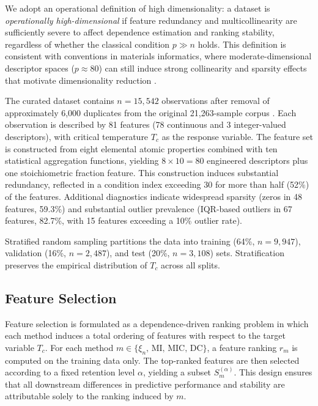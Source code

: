 \documentclass[twoside,11pt]{article}
\begin{document}
We adopt an operational definition of high dimensionality: a dataset is
\emph{operationally high-dimensional} if feature redundancy and multicollinearity
are sufficiently severe to affect dependence estimation and ranking stability,
regardless of whether the classical condition $p \gg n$ holds. This definition
is consistent with conventions in materials informatics, where
moderate-dimensional descriptor spaces ($p \approx 80$) can still induce strong
collinearity and sparsity effects that motivate dimensionality reduction
\citep{Fan2014challenges, Johnstone2009statistical, Stanev2018machine,
Yu2023prediction}.

The curated dataset contains $n = 15{,}542$ observations after removal of
approximately 6,000 duplicates from the original 21,263-sample corpus
\citep{Hamidieh2018data}. Each observation is described by 81 features
(78 continuous and 3 integer-valued descriptors), with critical temperature
$T_c$ as the response variable. The feature set is constructed from eight
elemental atomic properties combined with ten statistical aggregation functions,
yielding $8 \times 10 = 80$ engineered descriptors plus one stoichiometric
fraction feature. This construction induces substantial redundancy, reflected in
a condition index exceeding 30 for more than half (52\%) of the features.
Additional diagnostics indicate widespread sparsity (zeros in 48 features,
59.3\%) and substantial outlier prevalence (IQR-based outliers in 67 features,
82.7\%, with 15 features exceeding a 10\% outlier rate).

Stratified random sampling partitions the data into training (64\%,
$n = 9{,}947$), validation (16\%, $n = 2{,}487$), and test (20\%,
$n = 3{,}108$) sets. Stratification preserves the empirical distribution of
$T_c$ across all splits.

\subsection{Feature Selection}
Feature selection is formulated as a dependence-driven ranking problem in which
each method induces a total ordering of features with respect to the target
variable $T_c$. For each method
$m \in \{\xi_n,\, \mathrm{MI},\, \mathrm{MIC},\, \mathrm{DC}\}$, a feature
ranking $r_m$ is computed on the training data only. The top-ranked features
are then selected according to a fixed retention level $\alpha$, yielding a
subset $S_m^{(\alpha)}$. This design ensures that all downstream differences in
predictive performance and stability are attributable solely to the ranking
induced by $m$.
\end{document}

